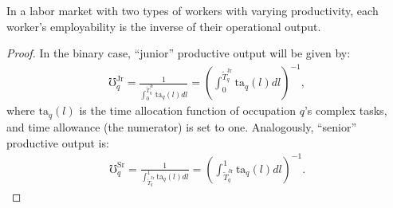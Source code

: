 \documentclass[hidelinks, nonatbib]{elsarticle}
\begin{document}
\begin{theorem}
    \label{bet}
    In a labor market with two types of workers with varying productivity, each worker's employability is the inverse of their operational output.
    \begin{proof}
        In the binary case, ``junior'' productive output will be given by:
        \begin{gather}
            \mho_{q}^{\text{Jr}} =
            \frac{
                1
            }{
                \int_{0}^{\tilde{T}_{q}^{\text{Jr}}}
                \text{ta}_q(l)
                dl
            } = 
            \left(
                \int_{0}^{\tilde{T}_{q}^{\text{Jr}}}
                    \text{ta}_q(l)
                    dl
            \right) ^ {-1}
            ,
        \end{gather}
        where $\text{ta}_q(l)$ is the time allocation function of occupation $q$'s complex tasks, and time allowance (the numerator) is set to one. Analogously, ``senior'' productive output is:
        \begin{gather}
            \mho_{q}^{\text{Sr}} =
            \frac{
                1
            }{
                \int_{\tilde{T}_{q}^{\text{Jr}}}^{1}
                \text{ta}_q(l)
                dl
            } = 
            \left(
                \int_{\tilde{T}_{q}^{\text{Jr}}}^{1}
                    \text{ta}_q(l)
                    dl
            \right) ^ {-1}
            .
        \end{gather}


\end{proof}
\end{theorem}
\end{document}
